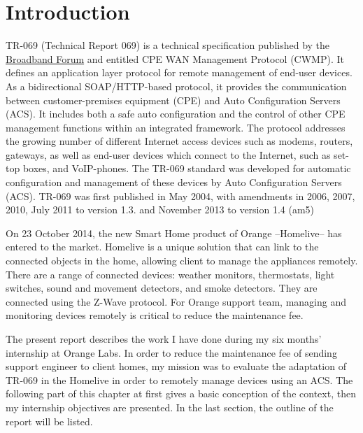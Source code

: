 
\chapter{Introduction} %

\label{Chapter1} %



TR-069 (Technical Report 069) is a technical specification published by the \href{https://www.broadband-forum.org/}{Broadband Forum} and entitled CPE WAN Management Protocol (CWMP)\cite{tr069}. It defines an application layer protocol for remote management of end-user devices. As a bidirectional SOAP/HTTP-based protocol, it provides the communication between customer-premises equipment (CPE) and Auto Configuration Servers (ACS). It includes both a safe auto configuration and the control of other CPE management functions within an integrated framework. The protocol addresses the growing number of different Internet access devices such as modems, routers, gateways, as well as end-user devices which connect to the Internet, such as set-top boxes, and VoIP-phones. The TR-069 standard was developed for automatic configuration and management of these devices by Auto Configuration Servers (ACS). TR-069 was first published in May 2004, with amendments in 2006, 2007, 2010, July 2011 to version 1.3. and November 2013 to version 1.4 (am5)

On 23 October 2014, the new Smart Home product of Orange --Homelive-- has entered to the market. Homelive is a unique solution that can link to the connected objects in the home, allowing client to manage the appliances remotely. There are a range of connected devices: weather monitors, thermostats, light switches, sound and movement detectors, and smoke detectors. They are connected using the Z-Wave protocol. For Orange support team, managing and monitoring devices remotely is critical to reduce the maintenance fee.

The present report describes the work I have done during my six months’ internship at Orange Labs. In order to reduce the maintenance fee of sending support engineer to client homes, my mission was to evaluate the adaptation of TR-069 in the Homelive in order to remotely manage devices using an ACS. The following part of this chapter at first gives a basic conception of the context, then my internship objectives are presented. In the last section, the outline of the report will be listed.

